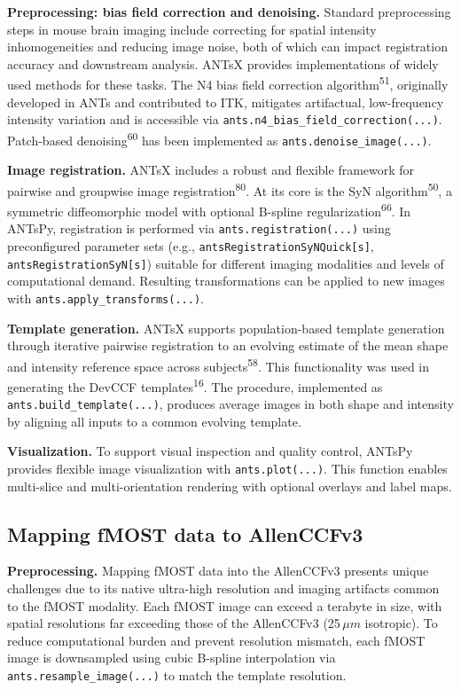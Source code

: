 \documentclass[
  12pt,
]{article}
\begin{document}
\textbf{Preprocessing: bias field correction and denoising.} Standard
preprocessing steps in mouse brain imaging include correcting for
spatial intensity inhomogeneities and reducing image noise, both of
which can impact registration accuracy and downstream analysis. ANTsX
provides implementations of widely used methods for these tasks. The N4
bias field correction algorithm\textsuperscript{51}, originally
developed in ANTs and contributed to ITK, mitigates artifactual,
low-frequency intensity variation and is accessible via
\texttt{ants.n4\_bias\_field\_correction(...)}. Patch-based
denoising\textsuperscript{60} has been implemented as
\texttt{ants.denoise\_image(...)}.

\textbf{Image registration.} ANTsX includes a robust and flexible
framework for pairwise and groupwise image
registration\textsuperscript{80}. At its core is the SyN
algorithm\textsuperscript{50}, a symmetric diffeomorphic model with
optional B-spline regularization\textsuperscript{66}. In ANTsPy,
registration is performed via \texttt{ants.registration(...)} using
preconfigured parameter sets (e.g.,
\texttt{antsRegistrationSyNQuick{[}s{]}},
\texttt{antsRegistrationSyN{[}s{]}}) suitable for different imaging
modalities and levels of computational demand. Resulting transformations
can be applied to new images with \texttt{ants.apply\_transforms(...)}.

\textbf{Template generation.} ANTsX supports population-based template
generation through iterative pairwise registration to an evolving
estimate of the mean shape and intensity reference space across
subjects\textsuperscript{58}. This functionality was used in generating
the DevCCF templates\textsuperscript{16}. The procedure, implemented as
\texttt{ants.build\_template(...)}, produces average images in both
shape and intensity by aligning all inputs to a common evolving
template.

\textbf{Visualization.} To support visual inspection and quality
control, ANTsPy provides flexible image visualization with
\texttt{ants.plot(...)}. This function enables multi-slice and
multi-orientation rendering with optional overlays and label maps.

\subsection{Mapping fMOST data to
AllenCCFv3}\label{mapping-fmost-data-to-allenccfv3}

\textbf{Preprocessing.} Mapping fMOST data into the AllenCCFv3 presents
unique challenges due to its native ultra-high resolution and imaging
artifacts common to the fMOST modality. Each fMOST image can exceed a
terabyte in size, with spatial resolutions far exceeding those of the
AllenCCFv3 (25\,\(\mu m\) isotropic). To reduce computational burden and
prevent resolution mismatch, each fMOST image is downsampled using cubic
B-spline interpolation via \texttt{ants.resample\_image(...)} to match
the template resolution.
\end{document}
